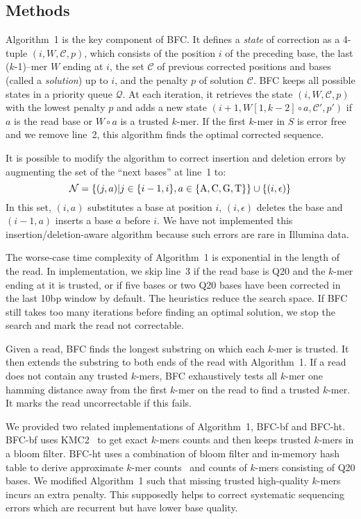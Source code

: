 \documentclass{bioinfo}
\begin{document}
\begin{methods}
\section{Methods}
Algorithm~1 is the key component of BFC. It defines a \emph{state}
of correction as a 4-tuple $(i,W,\mathcal{C},p)$, which consists of the
position $i$ of the preceding base, the last \mbox{($k$-1)--mer} $W$ ending at
$i$, the set $\mathcal{C}$ of previous corrected positions and bases (called a
\emph{solution}) up to $i$, and the penalty $p$ of solution $\mathcal{C}$. BFC
keeps all possible states in a priority queue $\mathcal{Q}$. At each iteration,
it retrieves the state $(i,W,\mathcal{C},p)$ with the lowest penalty $p$ and
adds a new state $(i+1,W[1,k-2]\circ a,\mathcal{C}',p')$ if $a$ is the read
base or $W\circ a$ is a trusted $k$-mer. If the first $k$-mer in $S$ is
error free and we remove line~2, this algorithm finds the optimal corrected
sequence.

It is possible to modify the algorithm to correct insertion and deletion
errors by augmenting the set of the ``next bases'' at line~1 to:
$$\mathcal{N}=\{(j,a)|j\in\{i-1,i\},a\in\{{\rm A},{\rm C},{\rm G},{\rm T}\}\}\cup\{(i,\epsilon)\}$$
In this set, $(i,a)$ substitutes a base at position $i$, $(i,\epsilon)$ deletes
the base and $(i-1,a)$ inserts a base $a$ before $i$. We have not
implemented this insertion/deletion-aware algorithm because such
errors are rare in Illumina data.

The worse-case time complexity of Algorithm~1 is exponential in the length of
the read. In implementation, we skip line~3 if the read base is Q20 and the
$k$-mer ending at it is trusted, or if five bases or two Q20 bases have been
corrected in the last 10bp window by default. The heuristics reduce the
search space. If BFC still takes too many iterations before finding an optimal
solution, we stop the search and mark the read not correctable.

Given a read, BFC finds the longest substring on which each $k$-mer is trusted. It
then extends the substring to both ends of the read with Algorithm~1. If a read
does not contain any trusted $k$-mers, BFC exhaustively tests all $k$-mer
one hamming distance away from the first $k$-mer on the read to find a trusted
$k$-mer. It marks the read uncorrectable if this fails.

We provided two related implementations of Algorithm~1, BFC-bf and BFC-ht.
BFC-bf uses KMC2~\citep{kmc2} to get exact $k$-mers counts and then keeps
trusted $k$-mers in a bloom filter. BFC-ht uses a combination of bloom filter
and in-memory hash table to derive approximate $k$-mer
counts~\citep{Melsted:2011bh} and counts of $k$-mers consisting of Q20 bases.
We modified Algorithm~1 such that missing trusted high-quality $k$-mers incurs
an extra penalty. This supposedly helps to correct systematic sequencing errors
which are recurrent but have lower base quality.


\end{methods}
\end{document}
